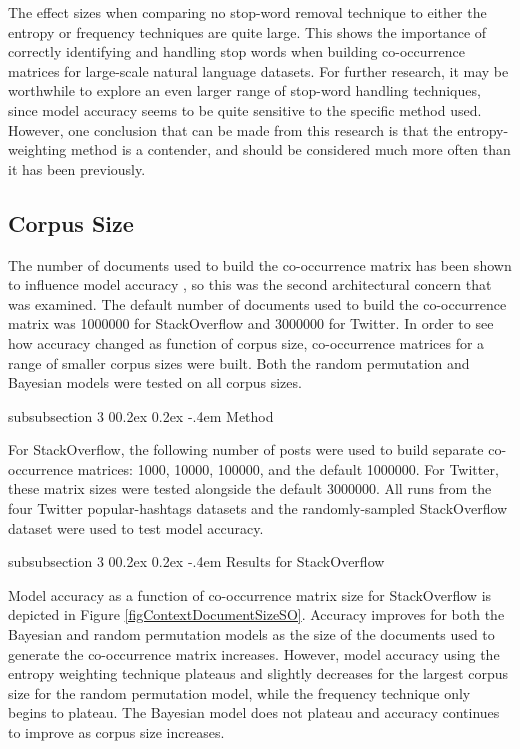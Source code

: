 \documentclass[man,donotrepeattitle]{apa6}
\makeatletter
\renewcommand{\subsubsection}{%
  \@startsection
  {subsubsection}%
  {3}%
  {\parindent}%
  {0\baselineskip \@plus 0.2ex \@minus 0.2ex}%
  {-.4em}%
  {\normalfont\normalsize\bfseries\addperi}}
\makeatother
\begin{document}
The effect sizes when comparing no stop-word removal technique to either the entropy or frequency techniques are quite large.
This shows the importance of correctly identifying and handling stop words when building co-occurrence matrices for large-scale natural language datasets.
For further research, it may be worthwhile to explore an even larger range of stop-word handling techniques,
since model accuracy seems to be quite sensitive to the specific method used. 
However, one conclusion that can be made from this research is that the entropy-weighting method is a contender, and should be considered much more often than it has been previously.

\subsection{Corpus Size}

The number of documents used to build the co-occurrence matrix has been shown to influence model accuracy \parencite{Sahlgren2008}, so this was the second architectural concern that was examined.
The default number of documents used to build the co-occurrence matrix was \num{1000000} for StackOverflow and \num{3000000} for Twitter.
In order to see how accuracy changed as function of corpus size, 
co-occurrence matrices for a range of smaller corpus sizes were built.
Both the random permutation and Bayesian models were tested on all corpus sizes.

\subsubsection{Method}

For StackOverflow, the following number of posts were used to build separate co-occurrence matrices: \num{1000}, \num{10000}, \num{100000}, and the default \num{1000000}.
For Twitter, these matrix sizes were tested alongside the default \num{3000000}.
All runs from the four Twitter popular-hashtags datasets and the randomly-sampled StackOverflow dataset were used to test model accuracy.

\subsubsection{Results for StackOverflow}

Model accuracy as a function of co-occurrence matrix size for StackOverflow is depicted in Figure \ref{figContextDocumentSizeSO}.
Accuracy improves for both the Bayesian and random permutation models as the size of the documents used to generate the co-occurrence matrix increases.
However, model accuracy using the entropy weighting technique plateaus and slightly decreases for the largest corpus size for the random permutation model, while the frequency technique only begins to plateau. 
The Bayesian model does not plateau and accuracy continues to improve as corpus size increases.
\end{document}
